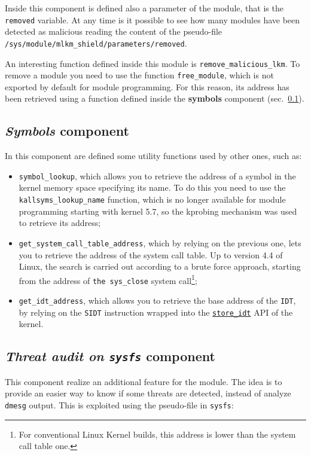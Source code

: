 \documentclass{article}
\begin{document}
	Inside this component is defined also a parameter of the module, that is the \texttt{removed} variable. At any time
	is it possible to see how many modules have been detected as malicious reading the content of the pseudo-file
	\texttt{/sys/module/mlkm\_shield/parameters/removed}.

	An interesting function defined inside this module is \texttt{remove\_malicious\_lkm}. To remove a module you need
	to use the function \texttt{free\_module}, which is not exported by default for module programming. For this
	reason, its address has been retrieved using a function defined inside the \textbf{symbols} component
	(sec.~\ref{sec:symbols}).

	\subsection{\emph{Symbols} component}\label{sec:symbols}
	In this component are defined some utility functions used by other ones, such as:
	\begin{itemize}
		\item \texttt{symbol\_lookup}, which allows you to retrieve the address of a symbol in the kernel memory space
		specifying its name. To do this you need to use the \texttt{kallsyms\_lookup\_name} function, which is no
		longer available for module programming starting with kernel 5.7, so the kprobing mechanism was used to
		retrieve its address;
		\item \texttt{get\_system\_call\_table\_address}, which by relying on the previous one, lets you to retrieve
		the address of the system call table. Up to version 4.4 of Linux, the search is carried out according to a
		brute force approach, starting from the address of \texttt{the sys\_close} system call\footnote{For
			conventional Linux Kernel builds, this address is lower than the system call table one.};
		\item \texttt{get\_idt\_address}, which allows you to retrieve the base address of the \texttt{IDT}, by relying
		on the \texttt{SIDT} instruction wrapped into the
		\href{https://elixir.bootlin.com/linux/latest/source/arch/x86/include/asm/desc.h#L223}{\texttt{store\_idt}} API
		of the kernel.
	\end{itemize}

	\subsection{\emph{Threat audit on \texttt{sysfs}} component}\label{sec:threats}
	This component realize an additional feature for the module. The idea is to provide an easier way to know if some
	threats are detected, instead of analyze \texttt{dmesg} output. This is exploited using the pseudo-file in \texttt{sysfs}:
\end{document}
